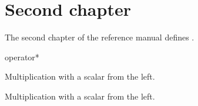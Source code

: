 \chapter{Second chapter}

The second chapter of the reference manual defines .

\gdef\ccTagOperatorLayout{\ccTrue}
\begin{ccRefFunction}{operator*}


       {Multiplication with a scalar from the left.}


       {Multiplication with a scalar from the left.}
\end{ccRefFunction}
